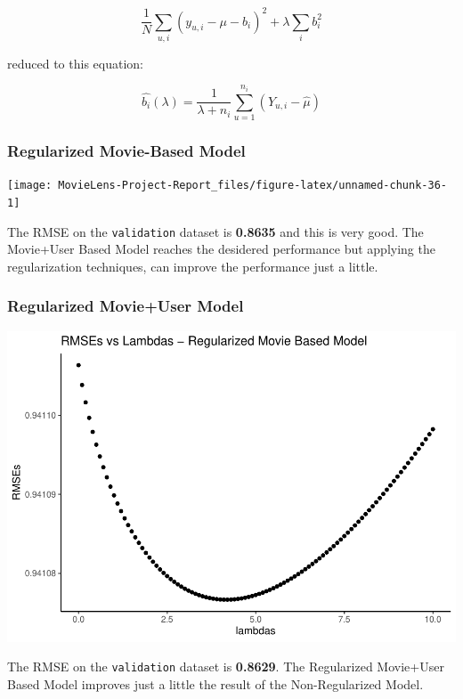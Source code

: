 \documentclass[
]{article}
\begin{document}
\[\frac{1}{N} \sum_{u,i} (y_{u,i} - \mu - b_{i})^{2} + \lambda \sum_{i} b_{i}^2\]

reduced to this equation:

\[\hat{b_{i}} (\lambda) = \frac{1}{\lambda + n_{i}} \sum_{u=1}^{n_{i}} (Y_{u,i} - \hat{\mu}) \]

\hypertarget{regularized-movie-based-model}{%
\subsubsection{Regularized Movie-Based
Model}\label{regularized-movie-based-model}}

\begin{center}\texttt{[image: MovieLens-Project-Report\_files/figure-latex/unnamed-chunk-36-1]} \end{center}

The RMSE on the \texttt{validation} dataset is \textbf{0.8635} and this
is very good. The Movie+User Based Model reaches the desidered
performance but applying the regularization techniques, can improve the
performance just a little.

\hypertarget{regularized-movieuser-model}{%
\subsubsection{Regularized Movie+User
Model}\label{regularized-movieuser-model}}

\begin{center}\includegraphics{MovieLens-Project-Report_files/figure-latex/unnamed-chunk-37-1} \end{center}

The RMSE on the \texttt{validation} dataset is \textbf{0.8629}. The
Regularized Movie+User Based Model improves just a little the result of
the Non-Regularized Model.
\end{document}
